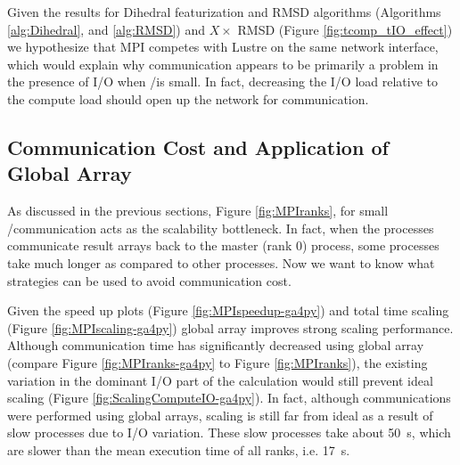 Given the results for Dihedral featurization and RMSD algorithms (Algorithms \ref{alg:Dihedral}, and \ref{alg:RMSD}) and $X\times$ RMSD (Figure \ref{fig:tcomp_tIO_effect})
we hypothesize that MPI competes with Lustre on the same network interface, which would explain why communication appears to
be primarily a problem in the presence of I/O when \tcomp/\tIO is small.
In fact, decreasing the I/O load relative to the compute load should open up the network for communication. 

\subsection{Communication Cost and Application of Global Array}
\label{Global-Array}
As discussed in the previous sections, Figure \ref{fig:MPIranks}, for small \tcomp/\tIO communication acts as the scalability bottleneck. 
In fact, when the processes communicate result arrays back to the master (rank 0) process, some processes take much longer as compared to other processes. 
Now we want to know what strategies can be used to avoid communication cost. 

Given the speed up plots (Figure \ref{fig:MPIspeedup-ga4py}) and total time scaling (Figure \ref{fig:MPIscaling-ga4py}) global array improves strong scaling performance.
Although communication time has significantly decreased using global array (compare Figure \ref{fig:MPIranks-ga4py} to Figure \ref{fig:MPIranks}),
the existing variation in the dominant I/O part of the calculation would still prevent ideal scaling (Figure \ref{fig:ScalingComputeIO-ga4py}).
In fact, although communications were performed using global arrays, scaling is still far from ideal as a result of slow processes due to I/O variation.
These slow processes take about 50~s, which are slower than the mean execution time of all ranks, i.e. 17~s. 

